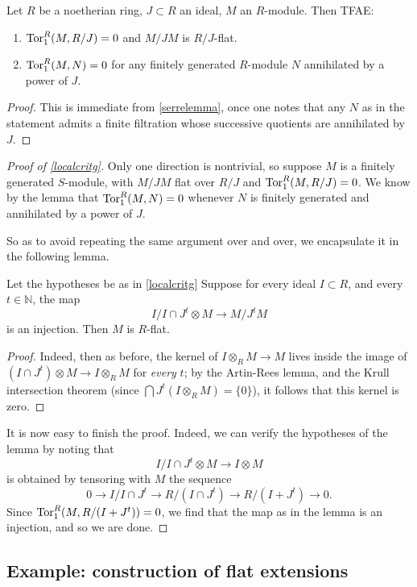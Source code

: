 \begin{lemma} 
Let $R$ be a noetherian ring, $J \subset R$ an ideal, $M$ an $R$-module. Then TFAE:
\begin{enumerate}
\item $\operatorname{Tor}_1^R(M, R/J) = 0$ and $M/JM$ is $R/J$-flat. 
\item $\operatorname{Tor}_1^R(M, N) = 0$ for any finitely generated $R$-module $N$
annihilated by a power of $J$.
\end{enumerate}
\end{lemma} 
\begin{proof} 
This is immediate from \cref{serrelemma}, once one notes that any $N$ as in the
statement admits a finite filtration whose successive quotients are annihilated
by $J$.
\end{proof} 
\begin{proof}[Proof of \cref{localcritg}]
Only one direction is nontrivial, so suppose $M$ is a finitely generated
$S$-module, with $M/JM$ flat over $R/J$ and $\operatorname{Tor}_1^R(M, R/J) = 0$.
We know by the lemma that $\operatorname{Tor}_1^R(M, N) = 0$ whenever $N$ is finitely
generated and annihilated by a power of $J$.


So as to avoid repeating the same argument over and over, we encapsulate it in
the following lemma.
\begin{lemma} Let the hypotheses be as in \cref{localcritg}
Suppose for every ideal $I \subset R$, and every $t \in \mathbb{N}$, the map
\[ I/I \cap J^t \otimes M \to M/J^t M  \]
is an injection. Then $M$ is $R$-flat.
\end{lemma} 
\begin{proof} 
Indeed, then as before, the kernel of $I \otimes_R M \to M$ lives inside the image of $(I \cap J^t)
\otimes M \to I \otimes_R M$ for \emph{every} $t$; by the Artin-Rees lemma, and the Krull
intersection theorem (since $\bigcap J^t(I \otimes_R M) = \{0\}$), it follows that this kernel is zero.
\end{proof} 

It is now easy to finish the proof. Indeed, we can verify the hypotheses of the
lemma by noting that
\[ I /I \cap J^t \otimes M \to I \otimes M  \]
is obtained by tensoring with $M$ the sequence
\[ 0 \to I/I \cap J^t \to R/(I \cap J^t) \to R/(I + J^t) \to 0.  \]
Since $\operatorname{Tor}_1^R(M, R/(I + J^t)) = 0$, we find that the map as in the lemma is
an injection, and so we are done.
\end{proof} 

\subsection{Example: construction of flat extensions}

